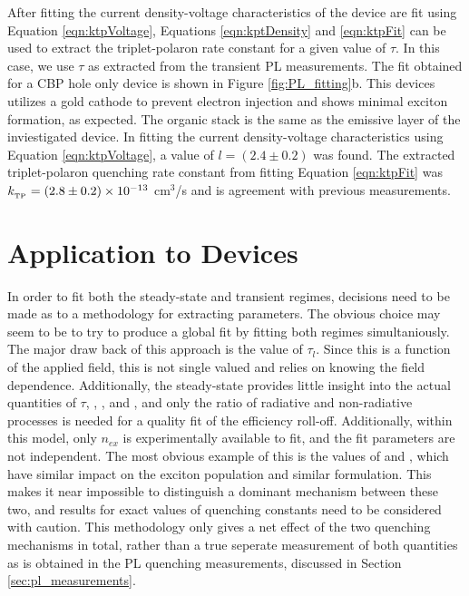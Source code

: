 \documentclass[../thesis.tex]{subfiles}
\begin{document}
After fitting the current density-voltage characteristics of the device are fit using Equation \ref{eqn:ktpVoltage}, Equations \ref{eqn:kptDensity} and \ref{eqn:ktpFit} can be used to extract the triplet-polaron rate constant for a given value of $\tau$.  
In this case, we use $\tau$ as extracted from the transient PL measurements.
The fit obtained for a CBP \irppy hole only device is shown in Figure \ref{fig:PL_fitting}b.
This devices utilizes a gold cathode to prevent electron injection and shows minimal exciton formation, as expected.
The organic stack is the same as the emissive layer of the inviestigated device.  
In fitting the current density-voltage characteristics using Equation \ref{eqn:ktpVoltage}, a value of $l=(2.4\pm0.2)$ was found.  
The extracted triplet-polaron quenching rate constant from fitting Equation \ref{eqn:ktpFit} was $k_{_\text{\tiny TP}}=(2.8\pm0.2)\times 10^{-13}$ cm$^3$/s and is agreement with previous measurements.\supercite{Erickson2014,Reineke2007}


\section{Application to Devices}

In order to fit both the steady-state and transient regimes, decisions need to be made as to a methodology for extracting parameters.  
The obvious choice may seem to be to try to produce a global fit by fitting both regimes simultaniously.  
The major draw back of this approach is the value of $\tau_l$.  
Since this is a function of the applied field, this is not single valued and relies on knowing the field dependence.
Additionally, the steady-state provides little insight into the actual quantities of $\tau$, \ktt, \ktp, and \kf, and only the ratio of radiative and non-radiative processes is needed for a quality fit of the efficiency roll-off.
Additionally, within this model, only $n_{ex}$ is experimentally available to fit, and the fit parameters are not independent.
The most obvious example of this is the values of \ktt and \ktp, which have similar impact on the exciton population and similar formulation.  
This makes it near impossible to distinguish a dominant mechanism between these two, and results for exact values of quenching constants need to be considered with caution.
This methodology only gives a net effect of the two quenching mechanisms in total, rather than a true seperate measurement of both quantities as is obtained in the PL quenching measurements, discussed in Section \ref{sec:pl_measurements}.
\end{document}
